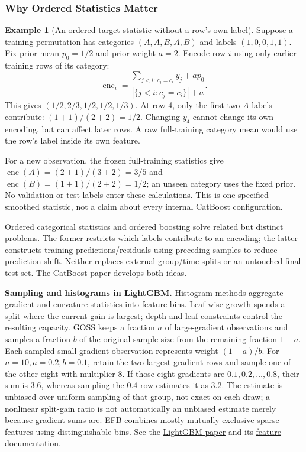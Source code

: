 \documentclass[11pt,twoside]{article}
\numberwithin{equation}{section}
\theoremstyle{plain}
\theoremstyle{definition}
\newtheorem{example}[theorem]{Example}
\theoremstyle{remark}
\begin{document}
\subsubsection{Why Ordered Statistics Matter}
\begin{example}[An ordered target statistic without a row's own label]
Suppose a training permutation has categories $(A,A,B,A,B)$ and labels $(1,0,0,1,1)$. Fix prior mean $p_0=1/2$ and prior weight $a=2$. Encode row $i$ using only earlier training rows of its category:
\[
\operatorname{enc}_i=\frac{\sum_{j<i:\,c_j=c_i}y_j+ap_0}{|\{j<i:c_j=c_i\}|+a}.
\]
This gives $(1/2,2/3,1/2,1/2,1/3)$. At row 4, only the first two $A$ labels contribute: $(1+1)/(2+2)=1/2$. Changing $y_4$ cannot change its own encoding, but can affect later rows. A raw full-training category mean would use the row's label inside its own feature.

For a new observation, the frozen full-training statistics give $\operatorname{enc}(A)=(2+1)/(3+2)=3/5$ and $\operatorname{enc}(B)=(1+1)/(2+2)=1/2$; an unseen category uses the fixed prior. No validation or test labels enter these calculations. This is one specified smoothed statistic, not a claim about every internal CatBoost configuration.
\end{example}
Ordered categorical statistics and ordered boosting solve related but distinct problems. The former restricts which labels contribute to an encoding; the latter constructs training predictions/residuals using preceding samples to reduce prediction shift. Neither replaces external group/time splits or an untouched final test set. The \href{https://arxiv.org/abs/1706.09516}{CatBoost paper} develops both ideas.

\textbf{Sampling and histograms in LightGBM.} Histogram methods aggregate gradient and curvature statistics into feature bins. Leaf-wise growth spends a split where the current gain is largest; depth and leaf constraints control the resulting capacity. GOSS keeps a fraction $a$ of large-gradient observations and samples a fraction $b$ of the original sample size from the remaining fraction $1-a$. Each sampled small-gradient observation represents weight $(1-a)/b$. For $n=10,a=0.2,b=0.1$, retain the two largest-gradient rows and sample one of the other eight with multiplier 8. If those eight gradients are $0.1,0.2,\ldots,0.8$, their sum is 3.6, whereas sampling the $0.4$ row estimates it as 3.2. The estimate is unbiased over uniform sampling of that group, not exact on each draw; a nonlinear split-gain ratio is not automatically an unbiased estimate merely because gradient sums are. EFB combines mostly mutually exclusive sparse features using distinguishable bins. See the \href{https://proceedings.neurips.cc/paper/2017/hash/6449f44a102fde848669bdd9eb6b76fa-Abstract.html}{LightGBM paper} and its \href{https://lightgbm.readthedocs.io/en/stable/Features.html}{feature documentation}.
\end{document}
